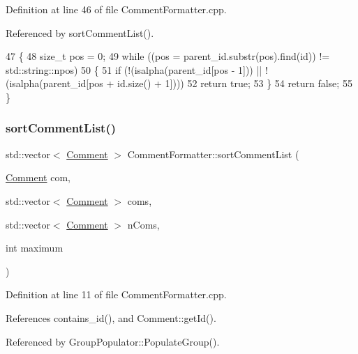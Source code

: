 Definition at line 46 of file Comment\+Formatter.\+cpp.



Referenced by sort\+Comment\+List().


\begin{DoxyCode}
47 \{
48     \textcolor{keywordtype}{size\_t} pos = 0;
49     \textcolor{keywordflow}{while} ((pos = parent\_id.substr(pos).find(\textcolor{keywordtype}{id})) != std::string::npos)
50     \{
51         \textcolor{keywordflow}{if} (!(isalpha(parent\_id[pos - 1])) || !(isalpha(parent\_id[pos + \textcolor{keywordtype}{id}.size() + 1])))
52             \textcolor{keywordflow}{return} \textcolor{keyword}{true};
53     \}
54     \textcolor{keywordflow}{return} \textcolor{keyword}{false};
55 \}
\end{DoxyCode}
\mbox{\label{class_comment_formatter_a6a9af9cdde666a914d97c3f45e6c8a49}} 
\subsubsection{\texorpdfstring{sort\+Comment\+List()}{sortCommentList()}}
{\footnotesize\ttfamily std\+::vector$<$ \hyperlink{class_comment}{Comment} $>$ Comment\+Formatter\+::sort\+Comment\+List (\begin{DoxyParamCaption}\item[{\hyperlink{class_comment}{Comment}}]{com,  }\item[{std\+::vector$<$ \hyperlink{class_comment}{Comment} $>$}]{coms,  }\item[{std\+::vector$<$ \hyperlink{class_comment}{Comment} $>$}]{n\+Coms,  }\item[{int}]{maximum }\end{DoxyParamCaption})}



Definition at line 11 of file Comment\+Formatter.\+cpp.



References contains\+\_\+id(), and Comment\+::get\+Id().



Referenced by Group\+Populator\+::\+Populate\+Group().



